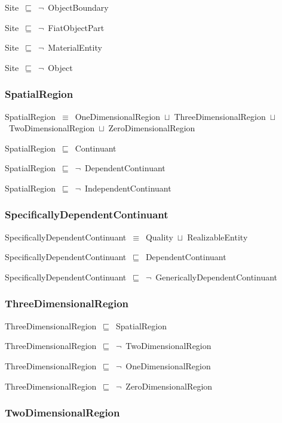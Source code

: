 \documentclass{article}
\begin{document}
Site~\ensuremath{\sqsubseteq}~\ensuremath{\lnot}~ObjectBoundary

Site~\ensuremath{\sqsubseteq}~\ensuremath{\lnot}~FiatObjectPart

Site~\ensuremath{\sqsubseteq}~\ensuremath{\lnot}~MaterialEntity

Site~\ensuremath{\sqsubseteq}~\ensuremath{\lnot}~Object

\subsubsection*{SpatialRegion}

SpatialRegion~\ensuremath{\equiv}~OneDimensionalRegion~\ensuremath{\sqcup}~ThreeDimensionalRegion~\ensuremath{\sqcup}~TwoDimensionalRegion~\ensuremath{\sqcup}~ZeroDimensionalRegion

SpatialRegion~\ensuremath{\sqsubseteq}~Continuant~

SpatialRegion~\ensuremath{\sqsubseteq}~\ensuremath{\lnot}~DependentContinuant

SpatialRegion~\ensuremath{\sqsubseteq}~\ensuremath{\lnot}~IndependentContinuant

\subsubsection*{SpecificallyDependentContinuant}

SpecificallyDependentContinuant~\ensuremath{\equiv}~Quality~\ensuremath{\sqcup}~RealizableEntity

SpecificallyDependentContinuant~\ensuremath{\sqsubseteq}~DependentContinuant~

SpecificallyDependentContinuant~\ensuremath{\sqsubseteq}~\ensuremath{\lnot}~GenericallyDependentContinuant

\subsubsection*{ThreeDimensionalRegion}

ThreeDimensionalRegion~\ensuremath{\sqsubseteq}~SpatialRegion~

ThreeDimensionalRegion~\ensuremath{\sqsubseteq}~\ensuremath{\lnot}~TwoDimensionalRegion

ThreeDimensionalRegion~\ensuremath{\sqsubseteq}~\ensuremath{\lnot}~OneDimensionalRegion

ThreeDimensionalRegion~\ensuremath{\sqsubseteq}~\ensuremath{\lnot}~ZeroDimensionalRegion

\subsubsection*{TwoDimensionalRegion}
\end{document}
